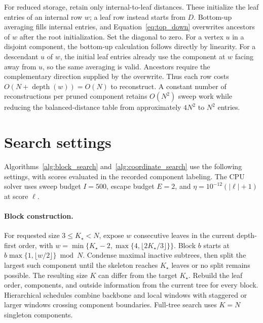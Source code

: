 For reduced storage, retain only internal-to-leaf distances.
These initialize the leaf entries of an internal row $w$; a leaf row instead starts from $D$.
Bottom-up averaging fills internal entries, and Equation~\eqref{eq:top_down} overwrites ancestors of $w$ after the root initialization.
Set the diagonal to zero.
For a vertex $u$ in a disjoint component, the bottom-up calculation follows directly by linearity.
For a descendant $u$ of $w$, the initial leaf entries already use the component at $w$ facing away from $u$, so the same averaging is valid.
Ancestors require the complementary direction supplied by the overwrite.
Thus each row costs $O(N+\operatorname{depth}(w))=O(N)$ to reconstruct.
A constant number of reconstructions per pruned component retains $O(N^2)$ sweep work while reducing the balanced-distance table from approximately $4N^2$ to $N^2$ entries.

\section{Search settings}
\label{sec:search_policies}

Algorithms~\ref{alg:block_search} and~\ref{alg:coordinate_search} use the following settings, with scores evaluated in the recorded component labeling.
The CPU solver uses sweep budget $I=500$, escape budget $E=2$, and $\eta=10^{-12}(|\ell|+1)$ at score $\ell$.

\paragraph{Block construction.}
For requested size $3\leq K_\star<N$, expose $w$ consecutive leaves in the current depth-first order, with
$w=\min\{K_\star-2,\max\{4,\lfloor2K_\star/3\rfloor\}\}$.
Block $b$ starts at $b\max\{1,\lfloor w/2\rfloor\}\bmod N$.
Condense maximal inactive subtrees, then split the largest such component until the skeleton reaches $K_\star$ leaves or no split remains possible.
The resulting size $K$ can differ from the target $K_\star$.
Rebuild the leaf order, components, and outside information from the current tree for every block.
Hierarchical schedules combine backbone and local windows with staggered or larger windows crossing component boundaries.
Full-tree search uses $K=N$ singleton components.

